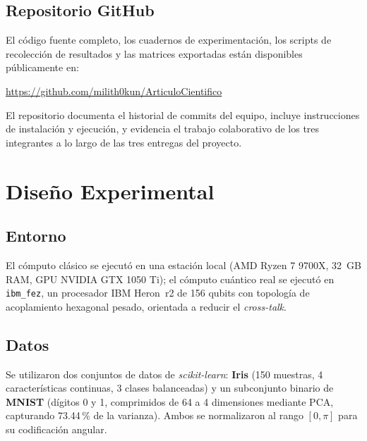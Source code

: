 \documentclass[conference]{IEEEtran}
\begin{document}
\subsection{Repositorio GitHub}
El código fuente completo, los cuadernos de experimentación, los scripts de recolección de resultados y las matrices exportadas están disponibles públicamente en:
\begin{center}
\url{https://github.com/milith0kun/ArticuloCientifico}
\end{center}
El repositorio documenta el historial de commits del equipo, incluye instrucciones de instalación y ejecución, y evidencia el trabajo colaborativo de los tres integrantes a lo largo de las tres entregas del proyecto.

\section{Diseño Experimental}
\label{sec:experimentacion}

\subsection{Entorno}
El cómputo clásico se ejecutó en una estación local (AMD Ryzen 7 9700X, 32~GB RAM, GPU NVIDIA GTX 1050 Ti); el cómputo cuántico real se ejecutó en \texttt{ibm\_fez}, un procesador IBM Heron~r2 \cite{ibm_quantum_2023} de 156 qubits con topología de acoplamiento hexagonal pesado, orientada a reducir el \textit{cross-talk}.

\subsection{Datos}
Se utilizaron dos conjuntos de datos de \textit{scikit-learn}: \textbf{Iris} \cite{fisher1936} (150 muestras, 4 características continuas, 3 clases balanceadas) y un subconjunto binario de \textbf{MNIST} (dígitos 0 y 1, comprimidos de 64 a 4 dimensiones mediante PCA, capturando 73.44\,\% de la varianza). Ambos se normalizaron al rango $[0,\pi]$ para su codificación angular.
\end{document}
